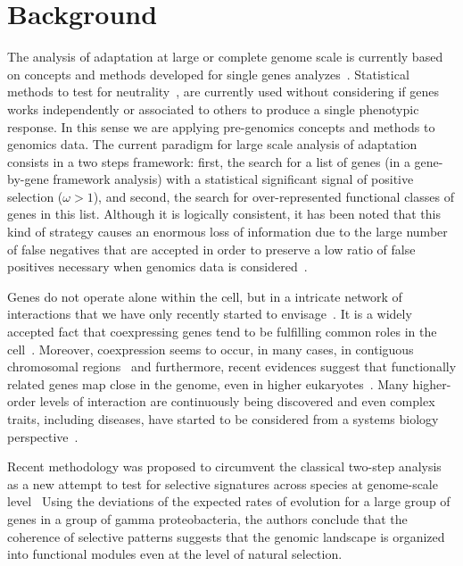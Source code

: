

\section{Background}

The analysis of adaptation at large or complete genome scale is currently based on concepts and methods developed for single genes analyzes~\cite{Arbiza2006,Bakewell2007,Bustamante2005,Clark2003,Nielsen2005}. Statistical methods to test for neutrality~\cite{Nielsen2001}, are currently used without considering if genes works independently or associated to others to produce a single phenotypic response. In this sense we are applying pre-genomics concepts and methods to genomics data. The current paradigm for large scale analysis of adaptation consists in a two steps framework: first, the search for a list of genes (in a gene-by-gene framework analysis) with a statistical significant signal of positive selection ($\omega > 1$), and second, the search for over-represented functional classes of genes in this list. Although it is logically consistent, it has been noted that this kind of strategy causes an enormous loss of information due to the large number of false negatives that are accepted in order to preserve a low ratio of false positives necessary when genomics data is considered~\cite{Al-Shahrour2007,Al-Shahrour2005a,Al-Shahrour2006,Subramanian2005}.

Genes do not operate alone within the cell, but in a intricate network of interactions that we have only recently started to envisage~\cite{Stelzl2005}. It is a widely accepted fact that coexpressing genes tend to be fulfilling common roles in the cell~\cite{Lee2003}. Moreover, coexpression seems to occur, in many cases, in contiguous chromosomal regions~\cite{Caron2001} and furthermore, recent evidences suggest that functionally related genes map close in the genome, even in higher eukaryotes~\cite{Hurst2004}. Many higher-order levels of interaction are continuously being discovered and even complex traits, including diseases, have started to be considered from a systems biology perspective~\cite{Ideker2008,Vamathevan2008}.

Recent methodology was proposed to circumvent the classical two-step analysis as a new attempt to test for selective signatures across species at genome-scale level~\cite{Shapiro2008} Using the deviations of the expected rates of evolution for a large group of genes in a group of gamma proteobacteria, the authors conclude that the coherence of selective patterns suggests that the genomic landscape is organized into functional modules even at the level of natural selection.

